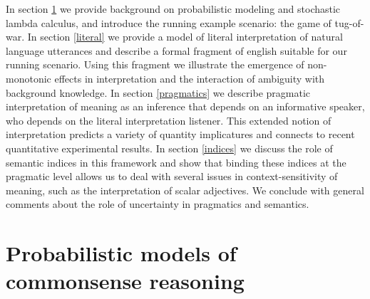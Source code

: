 \documentclass[pdfextras]{handbook}
\begin{document}
In section \ref{commonsense} we provide background on probabilistic modeling and stochastic lambda calculus, and introduce the running example scenario: the game of tug-of-war. In section \ref{literal} we provide a model of literal interpretation of natural language utterances and describe a formal fragment of english suitable for our running scenario. Using this fragment we illustrate the emergence of non-monotonic effects in interpretation and the interaction of ambiguity with background knowledge. In section \ref{pragmatics} we describe pragmatic interpretation of meaning as an inference that depends on an informative speaker, who depends on the literal interpretation listener. This extended notion of interpretation predicts a variety of quantity implicatures and connects to recent quantitative experimental results. In section \ref{indices} we discuss the role of semantic indices in this framework and show that binding these indices at the pragmatic level allows us to deal with several issues in context-sensitivity of meaning, such as the interpretation of scalar adjectives. We conclude with general comments about the role of uncertainty in pragmatics and semantics.



\section{Probabilistic models of commonsense reasoning}
\label{commonsense}


  
  
  
  
\end{document}
